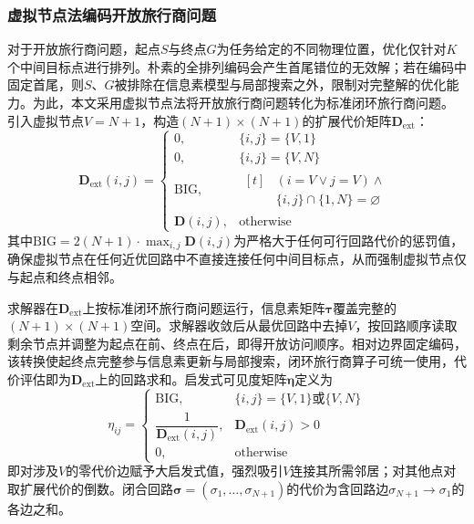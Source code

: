 \documentclass[lettersize,journal]{IEEEtran}
\begin{document}
\subsubsection{虚拟节点法编码开放旅行商问题}
\label{subsec:virtual}
对于开放旅行商问题，起点$S$与终点$G$为任务给定的不同物理位置，优化仅针对$K$个中间目标点进行排列。朴素的全排列编码会产生首尾错位的无效解；若在编码中固定首尾，则$S$、$G$被排除在信息素模型与局部搜索之外，限制对完整解的优化能力。为此，本文采用虚拟节点法将开放旅行商问题转化为标准闭环旅行商问题\textcolor{blue}{\cite{ref32}}。
引入虚拟节点$V = N + 1$，构造$(N+1) \times (N+1)$的扩展代价矩阵$\mathbf{D}_{\mathrm{ext}}$：
\begin{equation}
\mathbf{D}_{\mathrm{ext}}(i, j) =
\begin{cases}
0, & \{i, j\} = \{V, 1\} \\
0, & \{i, j\} = \{V, N\} \\
\mathrm{BIG}, & \begin{aligned}[t]
& (i = V \lor j = V) \land \\
& \{i, j\} \cap \{1, N\} = \varnothing
\end{aligned} \\
\mathbf{D}(i, j), & \text{otherwise}
\end{cases}
\label{eq:dext}
\end{equation}
其中$\mathrm{BIG} = 2(N+1) \cdot \max_{i,j} \mathbf{D}(i,j)$为严格大于任何可行回路代价的惩罚值，确保虚拟节点在任何近优回路中不直接连接任何中间目标点，从而强制虚拟节点仅与起点和终点相邻。

求解器在$\mathbf{D}_{\mathrm{ext}}$上按标准闭环旅行商问题运行，信息素矩阵$\bm{\tau}$覆盖完整的$(N+1)\times(N+1)$空间。求解器收敛后从最优回路中去掉$V$，按回路顺序读取剩余节点并调整为起点在前、终点在后，即得开放访问顺序。相对边界固定编码，该转换使起终点完整参与信息素更新与局部搜索，闭环旅行商算子可统一使用，代价评估即为$\mathbf{D}_{\mathrm{ext}}$上的回路求和。启发式可见度矩阵$\bm{\eta}$定义为
\begin{equation}
\eta_{ij} =
\begin{cases}
\mathrm{BIG}, & \{i, j\} = \{V, 1\} \text{或} \{V, N\} \\
\dfrac{1}{\mathbf{D}_{\mathrm{ext}}(i,j)}, & \mathbf{D}_{\mathrm{ext}}(i,j) > 0 \\
0, & \text{otherwise}
\end{cases}
\label{eq:eta}
\end{equation}
即对涉及$V$的零代价边赋予大启发式值，强烈吸引$V$连接其所需邻居；对其他点对取扩展代价的倒数。闭合回路$\bm{\sigma} = (\sigma_1, \dots, \sigma_{N+1})$的代价为含回路边$\sigma_{N+1} \to \sigma_1$的各边之和。
\end{document}
